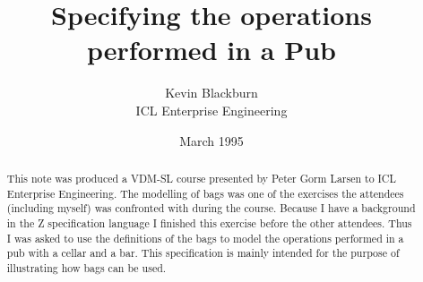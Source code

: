 \documentclass[a4paper,dvips]{article}
\begin{document}
\title{Specifying the operations performed in a Pub}
\author{Kevin Blackburn\\ ICL Enterprise Engineering}
\date{March 1995}
\maketitle

\begin{abstract}
This note was produced a VDM-SL course presented by Peter Gorm Larsen
to ICL Enterprise Engineering. The modelling of bags was one of the
exercises the attendees (including myself) was confronted with during
the course. Because I have a background in the Z specification
language I finished this exercise before the other attendees. Thus I
was asked to use the definitions of the bags to model the operations
performed in a pub with a cellar and a bar. This specification is
mainly intended for the purpose of illustrating how bags can be used.
\end{abstract}


 



\end{document}
